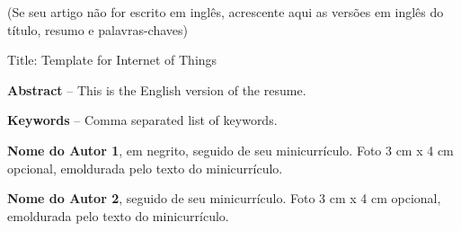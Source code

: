 \documentclass[
	article,			%
	12pt,				%
	oneside,			%
	a4paper,			%
	english,			%
	brazil,				%
	sumario=tradicional
	]{abntex2}
\begin{document}
(Se seu artigo não for escrito em inglês, acrescente aqui as versões em inglês do título, resumo e palavras-chaves)

\begin{changemargin}{1cm}{1cm} 

Title: Template for Internet of Things

\textbf{Abstract} – This is the English version of the resume.

\textbf{Keywords} – Comma separated list of keywords.

\end{changemargin}


\textbf{Nome do Autor 1}, em negrito, seguido de seu minicurrículo. Foto 3 cm x 4 cm opcional, emoldurada pelo texto do minicurrículo.


\textbf{Nome do Autor 2}, seguido de seu minicurrículo. Foto 3 cm x 4 cm opcional, emoldurada pelo texto do minicurrículo.
\end{document}
